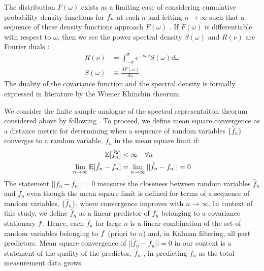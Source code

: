 The distribution $F(\omega)$ exists as a limiting case of considering cumulative probability density functions for $f_n$ at each $n$ and letting $n \to \infty$ such that a sequence of these density functions approach $F(\omega)$ \cite{karlin1975first}.  If $F(\omega)$ is differentiable with respect to $\omega$, then we see the power spectral density $S(\omega)$ and $R(\nu)$ are Fourier duals \cite{karlin1975first}:
\begin{align}
R(\nu) & = \int_{-\pi}^{\pi} e^{-i\omega \nu } S(\omega)d\omega \\
S(\omega) & \equiv \frac{dF(\omega)}{d\omega} 
\end{align}
The duality of the covariance function and the spectral density is formally expressed  in literature by the  Wiener Khinchin theorum.

We consider the finite sample analogue of the spectral representaiton theorum considered above by following \cite{hamilton1994time}. To proceed, we define mean square convergence as a distance metric for determining when a sequence of random variables $\{ \hat{f}_n\}$ converges to a random variable, $f_n$ in the mean square limit if:
\begin{align}
\mathbb{E}[\hat{f}_n^2] & < \infty \quad \forall n \\
\lim_{n \to \infty}\mathbb{E}[\hat{f}_n - f_n] & = \lim_{n \to \infty} ||\hat{f}_n- f_n || = 0
\end{align} 
The statement $||\hat{f}_n- f_n || = 0$ measures the closeness between random variables $\hat{f}_n$ and $f_n$ even though the mean square limit is defined for terms of a sequence of random variables, $\{ \hat{f}_n\}$, where convergence improves with $n \to \infty$. In context of this study, we define $\hat{f}_n$ as a linear predictor of $f_n$ belonging to a covariance stationary $f$. Hence, each $\hat{f}_n$ for large $n$ is a linear combination of the set of random variables belonging to $f$ (priori to $n$) and, in Kalman filtering, all past predictors. Mean square convergence of $||\hat{f}_n- f_n || = 0$ in our context is a statement of the quality of the predictor, $\hat{f}_n$ , in predicting $f_n$ as the total measurement data grows.

